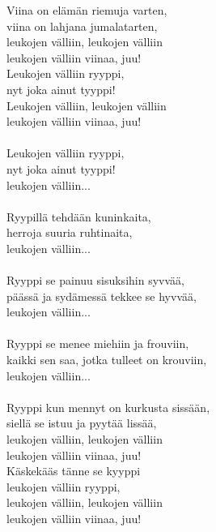 
            Viina on elämän riemuja varten, \\
            viina on lahjana jumalatarten, \\
            leukojen välliin, leukojen välliin \\
            leukojen välliin viinaa, juu! \\
            Leukojen välliin ryyppi, \\
            nyt joka ainut tyyppi! \\
            Leukojen välliin, leukojen välliin \\
            leukojen välliin viinaa, juu! \\
\hspace{10mm} \\
            Leukojen välliin ryyppi, \\
            nyt joka ainut tyyppi! \\
            leukojen välliin... \\
\hspace{10mm} \\
            Ryypillä tehdään kuninkaita, \\
            herroja suuria ruhtinaita, \\
            leukojen välliin... \\
\hspace{10mm} \\
            Ryyppi se painuu sisuksihin syvvää, \\
            päässä ja sydämessä tekkee se hyvvää, \\
            leukojen välliin... \\
\hspace{10mm} \\
            Ryyppi se menee miehiin ja frouviin, \\
            kaikki sen saa, jotka tulleet on krouviin, \\
            leukojen välliin... \\
\hspace{10mm} \\
            Ryyppi kun mennyt on kurkusta sissään, \\
            siellä se istuu ja pyytää lissää, \\
            leukojen välliin, leukojen välliin \\
            leukojen välliin viinaa, juu! \\
            Käskekääs tänne se kyyppi \\
            leukojen välliin ryyppi, \\
            leukojen välliin, leukojen välliin \\
            leukojen välliin viinaa, juu! \\
